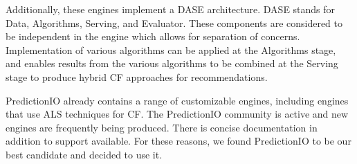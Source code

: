 Additionally, these engines implement a DASE architecture. DASE stands for Data, Algorithms, Serving, and Evaluator. These components are considered to be independent in the engine which allows for separation of concerns. Implementation of various algorithms can be applied at the Algorithms stage, and enables results from the various algorithms to be combined at the Serving stage to produce hybrid CF approaches for recommendations.

PredictionIO already contains a range of customizable engines, including engines that use ALS techniques for CF. The PredictionIO community is active and new engines are frequently being produced. There is concise documentation in addition to support available. For these reasons, we found PredictionIO to be our best candidate and decided to use it. 




